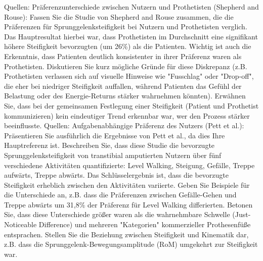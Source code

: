\documentclass{SeminarV2}
\begin{document}
Quellen:
Präferenzunterschiede zwischen Nutzern und Prothetisten (Shepherd and Rouse): Fassen Sie die Studie von Shepherd and Rouse zusammen, die die Präferenzen für Sprunggelenksteifigkeit bei Nutzern und Prothetisten verglich. Das Hauptresultat hierbei war, dass Prothetisten im Durchschnitt eine signifikant höhere Steifigkeit bevorzugten (um 26\%) als die Patienten. Wichtig ist auch die Erkenntnis, dass Patienten deutlich konsistenter in ihrer Präferenz waren als Prothetisten. Diskutieren Sie kurz mögliche Gründe für diese Diskrepanz (z.B. Prothetisten verlassen sich auf visuelle Hinweise wie "Fusschlag" oder "Drop-off", die eher bei niedriger Steifigkeit auffallen, während Patienten das Gefühl der Belastung oder des Energie-Returns stärker wahrnehmen könnten). Erwähnen Sie, dass bei der gemeinsamen Festlegung einer Steifigkeit (Patient und Prothetist kommunizieren) kein eindeutiger Trend erkennbar war, wer den Prozess stärker beeinflusste.
Quellen:
Aufgabenabhängige Präferenz des Nutzers (Pett et al.): Präsentieren Sie ausführlich die Ergebnisse von Pett et al., da dies Ihre Hauptreferenz ist. Beschreiben Sie, dass diese Studie die bevorzugte Sprunggelenksteifigkeit von transtibial amputierten Nutzern über fünf verschiedene Aktivitäten quantifizierte: Level Walking, Steigung, Gefälle, Treppe aufwärts, Treppe abwärts. Das Schlüsselergebnis ist, dass die bevorzugte Steifigkeit erheblich zwischen den Aktivitäten variierte. Geben Sie Beispiele für die Unterschiede an, z.B. dass die Präferenzen zwischen Gefälle-Gehen und Treppe abwärts um 31,8\% der Präferenz für Level Walking differierten. Betonen Sie, dass diese Unterschiede größer waren als die wahrnehmbare Schwelle (Just-Noticeable Difference) und mehreren "Kategorien" kommerzieller Prothesenfüße entsprachen. Stellen Sie die Beziehung zwischen Steifigkeit und Kinematik dar, z.B. dass die Sprunggelenk-Bewegungsamplitude (RoM) umgekehrt zur Steifigkeit war.
\end{document}
